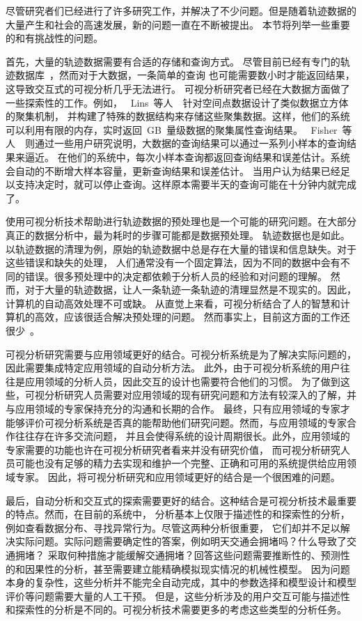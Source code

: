 \documentclass[12pt,twocolumn]{article}
\begin{document}
尽管研究者们已经进行了许多研究工作，并解决了不少问题。但是随着轨迹数据的大量产生和社会的高速发展，新的问题一直在不断被提出。
本节将列举一些重要的和有挑战性的问题。

首先，大量的轨迹数据需要有合适的存储和查询方式。
尽管目前已经有专门的轨迹数据库~\citep{GuetingBADHS2004}，然而对于大数据，一条简单的查询
也可能需要数小时才能返回结果，这导致交互式的可视分析几乎无法进行。
可视分析研究者已经在大数据方面做了一些探索性的工作。例如，
~Lins~等人~\citep{LinsTKS2013}~针对空间点数据设计了类似数据立方体的聚集机制，
并构建了特殊的数据结构来存储这些聚集数据。这样，他们的系统可以利用有限的内存，实时返回~GB~量级数据的聚集属性查询结果。
~Fisher~等人~\citep{FisherPDm2012}~则通过一些用户研究说明，大数据的查询结果可以通过一系列小样本的查询结果来逼近。
在他们的系统中，每次小样本查询都返回查询结果和误差估计。系统会自动的不断增大样本容量，更新查询结果和误差估计。
当用户认为结果已经足以支持决定时，就可以停止查询。这样原本需要半天的查询可能在十分钟内就完成了。

使用可视分析技术帮助进行轨迹数据的预处理也是一个可能的研究问题。在大部分真正的数据分析中，最为耗时的步骤可能都是数据预处理。
轨迹数据也是如此。以轨迹数据的清理为例，原始的轨迹数据中总是存在大量的错误和信息缺失。对于这些错误和缺失的处理，
人们通常没有一个固定算法，因为不同的数据中会有不同的错误。很多预处理中的决定都依赖于分析人员的经验和对问题的理解。
然而，对于大量的轨迹数据，让人一条轨迹一条轨迹的清理显然是不现实的。因此，计算机的自动高效处理不可或缺。
从直觉上来看，可视分析结合了人的智慧和计算机的高效，应该很适合解决预处理的问题。
然而事实上，目前这方面的工作还很少~\citep{LiaoYC2010,LuCLNYQ2014}。

可视分析研究需要与应用领域更好的结合。可视分析系统是为了解决实际问题的，因此需要集成特定应用领域的自动分析方法。
此外，由于可视分析系统的用户往往是应用领域的分析人员，因此交互的设计也需要符合他们的习惯。
为了做到这些，可视分析研究人员需要对应用领域的现有研究问题和方法有较深入的了解，并与应用领域的专家保持充分的沟通和长期的合作。
最终，只有应用领域的专家才能够评价可视分析系统是否真的能帮助他们研究问题。然而，与应用领域的专家合作往往存在许多交流问题，
并且会使得系统的设计周期很长。此外，应用领域的专家需要的功能也许在可视分析研究者看来并没有研究价值，
而可视分析研究人员可能也没有足够的精力去实现和维护一个完整、正确和可用的系统提供给应用领域专家。
因此，将可视分析研究和应用领域更好的结合是一个很困难的问题。

最后，自动分析和交互式的探索需要更好的结合。这种结合是可视分析技术最重要的特点。然而，在目前的系统中，
分析基本上仅限于描述性的和探索性的分析，例如查看数据分布、寻找异常行为。尽管这两种分析很重要，
它们却并不足以解决实际问题。实际问题需要确定性的答案，例如明天交通会拥堵吗？什么导致了交通拥堵？
采取何种措施才能缓解交通拥堵？回答这些问题需要推断性的、预测性的和因果性的分析，甚至需要建立能精确模拟现实情况的机械性模型。
因为问题本身的复杂性，这些分析并不能完全自动完成，其中的参数选择和模型设计和模型评价等问题需要大量的人工干预。
但是，这些分析涉及的用户交互可能与描述性和探索性的分析是不同的。可视分析技术需要更多的考虑这些类型的分析任务。
\end{document}
